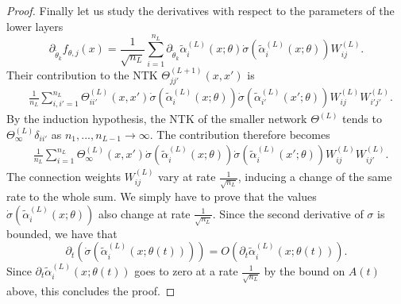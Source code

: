 \documentclass{article}
\begin{document}
\begin{proof}
Finally let us study the derivatives with respect to the parameters of the lower layers 
$$
\partial_{\tilde{\theta}_k} f_{\theta, j}(x) = \frac{1}{\sqrt{n_L}} \sum_{i=1}^{n_L} \partial_{\tilde{\theta}_k} \tilde{\alpha}^{(L)}_{i}(x;\theta) \dot{\sigma}\left(\tilde{\alpha}^{(L)}_i(x;\theta)\right) W^{(L)}_{ij}.
$$
Their contribution to the NTK $\Theta^{(L+1)}_{jj'}(x, x')$ is
\begin{align*}
    &\frac{1}{n_L}\! \sum_{i, i'=1}^{n_L}\! \Theta^{(L)}_{ii'}(x, x') \dot{\sigma}\!\left(\!\tilde{\alpha}^{(L)}_i(x;\theta)\!\right) \dot{\sigma}\!\left(\!\tilde{\alpha}^{(L)}_{i'}(x';\theta)\!\right) W^{(L)}_{ij}W^{(L)}_{i'j'}.
\end{align*}
By the induction hypothesis, the NTK of the smaller network $\Theta^{(L)}$ tends to $\Theta^{(L)}_\infty \delta_{ii'}$ as $n_1, ..., n_{L-1} \to \infty$. The contribution therefore becomes
\begin{align*}
    &\frac{1}{n_L}\! \sum_{i=1}^{n_L}\! \Theta^{(L)}_\infty(x, x') \dot{\sigma}\!\left(\!\tilde{\alpha}^{(L)}_i(x;\theta)\!\right) \dot{\sigma}\!\left(\!\tilde{\alpha}^{(L)}_{i}(x';\theta)\!\right) W^{(L)}_{ij}W^{(L)}_{ij'}.
\end{align*}
The connection weights $W^{(L)}_{ij}$ vary at rate $\frac{1}{\sqrt{n_L}}$, inducing a change of the same rate to the whole sum. We simply have to prove that the values $\dot{\sigma}(\tilde{\alpha}^{(L)}_i(x;\theta))$ also change at rate $\frac{1}{\sqrt{n_L}}$. Since the second derivative of $ \sigma $ is bounded, we have that 
\[
 \partial_t \left( \dot{\sigma}\left(\tilde{\alpha}^{(L)}_i(x;\theta(t))\right)  \right) = O\left( \partial_t \tilde{\alpha}^{(L)}_i(x;\theta(t)) \right).
\]
Since $  \partial_t \tilde{\alpha}^{(L)}_i(x;\theta(t)) $ goes to zero at a rate $\frac{1}{\sqrt{n_L}}$ by the bound on $ A(t) $ above, this concludes the proof.



\end{proof}
\end{document}
